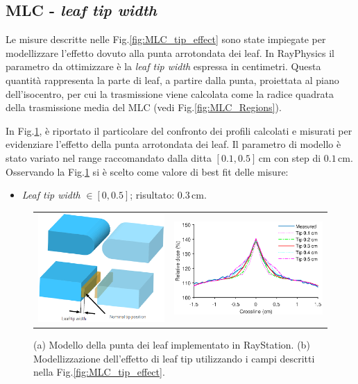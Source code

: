 \subsection{MLC - \textit{leaf tip width}}
Le misure descritte nelle Fig.\ref{fig:MLC_tip_effect} sono state impiegate per modellizzare l'effetto dovuto alla punta arrotondata dei leaf. In RayPhysics il parametro da ottimizzare è la \textit{leaf tip width} espressa in centimetri. Questa quantità rappresenta la parte di leaf, a partire dalla punta, proiettata al piano dell'isocentro, per cui la trasmissione viene calcolata come la radice quadrata della trasmissione media del MLC (vedi Fig.\ref{fig:MLC_Regions}).

In Fig.\ref{fig:MLC_tip_model}, è riportato il particolare del confronto dei profili calcolati e misurati per evidenziare l'effetto della punta arrotondata dei leaf. Il parametro di modello è stato variato nel range raccomandato dalla ditta $[0.1, 0.5]\,$cm con step di $0.1\,$cm. Osservando la Fig.\ref{fig:MLC_tip_model} si è scelto come valore di best fit delle misure:
\begin{itemize}
\item \textit{Leaf tip width} $\in [0,0.5]$; risultato: $0.3\,$cm.
\end{itemize}

\begin{figure}[!t]
\centering
\begin{tabular}{m{}m{}}
\vspace*{-.3cm}\includegraphics[width=.38\textwidth]{./cap2/MLC_tip_model.png} &
\includegraphics[width=.6\textwidth]{./cap2/MLC_Plots/Abutted/PlotMLC_Tip_modeling.eps}
\end{tabular}
\caption{(a) Modello della punta dei leaf implementato in RayStation. (b) Modellizzazione dell'effetto di leaf tip utilizzando i campi descritti nella Fig.\ref{fig:MLC_tip_effect}.}
\label{fig:MLC_tip_model}
\end{figure}

